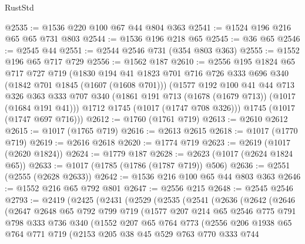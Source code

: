 \begin{lexlean}{RustStd}
\begin{coremodule}
@2535 := @1536 @220 @100 @67 @44 @804 @363
@2541 := @1524 @196 @216 @65 @65 @731 @803
@2544 := @1536 @196 @218 @65
@2545 := @36 @65
@2546 := @2545 @44
@2551 := @2544 @2546 @731 (@354 @803 @363)
@2555 := @1552 @196 @65 @717 @729
@2556 := @1562 @187
@2610 := @2556
    @195
    @1824
    @65
    @717
    @727
    @719
    (@1830
      @194
      @41
      @1823
      @701
      @716
      @726
      @333
      @696
      @340
      (@1842 @701 @1845 (@1607 (@1608 @701)))
      (@1577
        @192
        @100
        @41
        @44
        @713
        @326
        @363
        @333
        @707
        @340
        (@1861 @191 @713 (@1678 (@1679 @713)) (@1017 (@1684 @191 @41)))
        @1712
        @1745
        (@1017 (@1747 @708 @326)))
      @1745
      (@1017 (@1747 @697 @716)))
@2612 := @1760 (@1761 @719)
@2613 := @2610 @2612
@2615 := @1017 (@1765 @719)
@2616 := @2613 @2615
@2618 := @1017 (@1770 @719)
@2619 := @2616 @2618
@2620 := @1774 @719
@2623 := @2619 (@1017 (@2620 @1824))
@2624 := @1779 @187
@2628 := @2623 (@1017 (@2624 @1824 @65))
@2633 := @1017 (@1785 (@1786 (@1787 @719)) @506)
@2636 := @2551 (@2555 (@2628 @2633))
@2642 := @1536 @216 @100 @65 @44 @803 @363
@2646 := @1552 @216 @65 @792 @801
@2647 := @2556 @215
@2648 := @2545 @2546
@2793 := @2419
    (@2425
      (@2431
        (@2529
          (@2535
            (@2541
              (@2636
                (@2642
                  (@2646
                    (@2647
                      @2648
                      @65
                      @792
                      @799
                      @719
                      (@1577
                        @207
                        @214
                        @65
                        @2546
                        @775
                        @791
                        @798
                        @333
                        @736
                        @340
                        (@1552
                          @207
                          @65
                          @764
                          @773
                          (@2556
                            @206
                            @1938
                            @65
                            @764
                            @771
                            @719
                            (@2153
                              @205
                              @38
                              @45
                              @529
                              @763
                              @770
                              @333
                              @744

\end{coremodule}
\end{lexlean}
